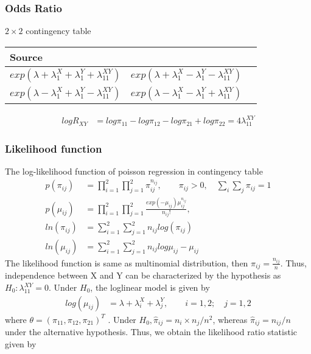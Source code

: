\documentclass[11pt]{article} %
\begin{document}
 \subsubsection{Odds Ratio} 

$2 \times 2$ contingency table\\
\begin{tabular}{l r r}
Source & &   \\\hline
$exp(\lambda + \lambda_1^X + \lambda_1^Y + \lambda_{11}^{XY})$ & $exp(\lambda + \lambda_1^X - \lambda_1^Y - \lambda_{11}^{XY})$ \\
$exp(\lambda - \lambda_1^X + \lambda_1^Y - \lambda_{11}^{XY})$ & $exp(\lambda - \lambda_1^X - \lambda_1^Y + \lambda_{11}^{XY})$ \\
\hline
\end{tabular}
 \begin{align*}
   log R_{XY} &= log \pi_{11} - log \pi_{12} - log \pi_{21} + log \pi_{22} = 4 \lambda_{11}^{XY}
\end{align*}

 \subsubsection{Likelihood function} 
The log-likelihood function of poisson regression in contingency table
\begin{align*}
	p(\pi_{ij}) &= \prod_{i=1}^2 \prod_{j=1}^2 \pi_{ij}^{n_{ij}}, \qquad \pi_{ij} >0, \quad \sum_{i}\sum_{j} \pi_{ij} = 1 \\
	p(\mu_{ij}) &= \prod_{i=1}^2 \prod_{j=1}^2 \frac{exp(-\mu_{ij}) \mu_{ij}^{n_{ij}}}{n_{ij}!},  \\
	ln(\pi_{ij}) & = \sum_{i=1}^2  \sum_{j=1}^2 n_{ij} log (\pi_{ij})\\
	ln(\mu_{ij}) & = \sum_{i=1}^2  \sum_{j=1}^2 n_{ij} log \mu_{ij} - \mu_{ij}
\end{align*}
The likelihood function is same as multinomial distribution, then $\pi_{ij}= \frac{n_{ij}}{n}$. 
Thus, independence between X and Y can be characterized by the hypothesis as $H_0 : \lambda^{XY}_{11} = 0$. Under $H_0$, the loglinear model is given by
\begin{align*}
log (\mu_{ij}) &= \lambda + \lambda_i^X + \lambda_j^Y, \qquad i=1,2; \quad j=1,2
\end{align*}
where $\theta = (\pi_{11}, \pi_{12}, \pi_{21})^T$ . Under $H_0, \hat{\pi}_{ij} = n_i \times n_j/n^2$, whereas $ \hat{\pi}_{ij} = n_{ij}/n$ under the alternative hypothesis. Thus, we obtain the likelihood ratio statistic given by
\end{document}
